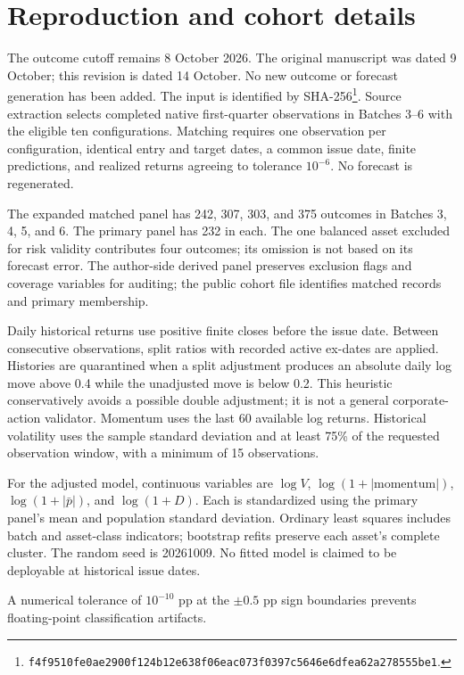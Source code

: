 \documentclass[11pt]{article}
\begin{document}
\clearpage
{\small}
\clearpage
\appendix
\section{Reproduction and cohort details}\label{app:reproduce}
The outcome cutoff remains 8 October 2026. The original manuscript was dated 9 October; this revision is dated 14 October. No new outcome or forecast generation has been added. The input is identified by SHA-256\footnote{\texttt{f4f9510fe0ae2900f124b12e638f06eac073f0397c5646e6dfea62a278555be1}.}. Source extraction selects completed native first-quarter observations in Batches 3--6 with the eligible ten configurations. Matching requires one observation per configuration, identical entry and target dates, a common issue date, finite predictions, and realized returns agreeing to tolerance $10^{-6}$. No forecast is regenerated.

The expanded matched panel has 242, 307, 303, and 375 outcomes in Batches 3, 4, 5, and 6. The primary panel has 232 in each. The one balanced asset excluded for risk validity contributes four outcomes; its omission is not based on its forecast error. The author-side derived panel preserves exclusion flags and coverage variables for auditing; the public cohort file identifies matched records and primary membership.

Daily historical returns use positive finite closes before the issue date. Between consecutive observations, split ratios with recorded active ex-dates are applied. Histories are quarantined when a split adjustment produces an absolute daily log move above 0.4 while the unadjusted move is below 0.2. This heuristic conservatively avoids a possible double adjustment; it is not a general corporate-action validator. Momentum uses the last 60 available log returns. Historical volatility uses the sample standard deviation and at least 75\% of the requested observation window, with a minimum of 15 observations.

For the adjusted model, continuous variables are $\log V$, $\log(1+|\text{momentum}|)$, $\log(1+|\bar p|)$, and $\log(1+D)$. Each is standardized using the primary panel's mean and population standard deviation. Ordinary least squares includes batch and asset-class indicators; bootstrap refits preserve each asset's complete cluster. The random seed is 20261009. No fitted model is claimed to be deployable at historical issue dates.

A numerical tolerance of $10^{-10}$ pp at the $\pm0.5$ pp sign boundaries prevents floating-point classification artifacts.
\end{document}
